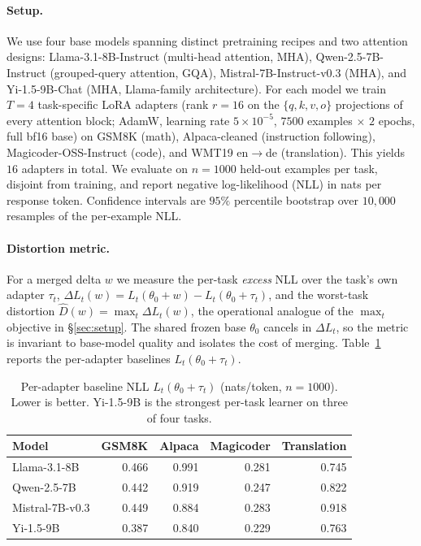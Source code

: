 \paragraph{Setup.} We use four base models spanning distinct
pretraining recipes and two attention designs:
Llama-3.1-8B-Instruct (multi-head attention, MHA),
Qwen-2.5-7B-Instruct (grouped-query attention, GQA),
Mistral-7B-Instruct-v0.3 (MHA), and Yi-1.5-9B-Chat (MHA,
Llama-family architecture). For each model we train $T=4$
task-specific LoRA adapters (rank $r = 16$ on the
$\{q,k,v,o\}$ projections of every attention block; AdamW,
learning rate $5\times10^{-5}$, $7500$ examples $\times$ $2$
epochs, full bf16 base) on GSM8K (math), Alpaca-cleaned
(instruction following), Magicoder-OSS-Instruct (code), and
WMT19 en$\to$de (translation). This yields $16$ adapters in
total. We evaluate on $n = 1000$ held-out examples per task,
disjoint from training, and report negative log-likelihood (NLL)
in nats per response token. Confidence intervals are $95\%$
percentile bootstrap over $10{,}000$ resamples of the per-example
NLL.

\paragraph{Distortion metric.} For a merged delta $w$ we measure
the per-task \emph{excess} NLL over the task's own adapter
$\tau_t$, $\Delta L_t(w) = L_t(\theta_0 + w) - L_t(\theta_0 +
\tau_t)$, and the worst-task distortion $\widehat D(w) = \max_t
\Delta L_t(w)$, the operational analogue of the
$\max_t$ objective in \S\ref{sec:setup}. The shared frozen base
$\theta_0$ cancels in $\Delta L_t$, so the metric is invariant
to base-model quality and isolates the cost of merging.
Table~\ref{tab:nll-tau} reports the per-adapter baselines
$L_t(\theta_0 + \tau_t)$.

\begin{table}[t]
\centering
\caption{Per-adapter baseline NLL $L_t(\theta_0+\tau_t)$ (nats/token,
$n=1000$). Lower is better. Yi-1.5-9B is the strongest per-task
learner on three of four tasks.}
\label{tab:nll-tau}
\begin{tabular}{lrrrr}
\hline
Model & GSM8K & Alpaca & Magicoder & Translation \\
\hline
Llama-3.1-8B    & 0.466 & 0.991 & 0.281 & 0.745 \\
Qwen-2.5-7B     & 0.442 & 0.919 & 0.247 & 0.822 \\
Mistral-7B-v0.3 & 0.449 & 0.884 & 0.283 & 0.918 \\
Yi-1.5-9B       & 0.387 & 0.840 & 0.229 & 0.763 \\
\hline
\end{tabular}
\end{table}

